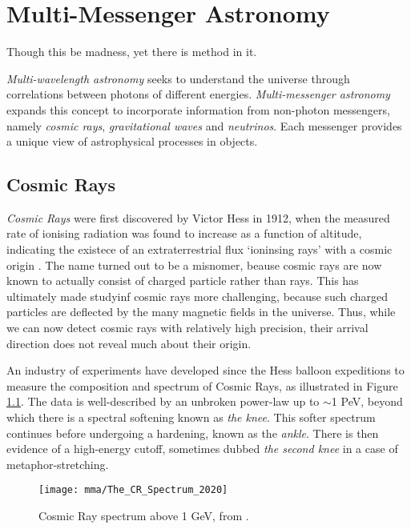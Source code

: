 \setchapterpreamble[u]{\margintoc}
\chapter{Multi-Messenger Astronomy}
\begin{fquote} Though this be madness, yet there is method in it.
\end{fquote}

\emph{Multi-wavelength astronomy} seeks to understand the universe through correlations between photons of different energies. \emph{Multi-messenger astronomy} expands this concept to incorporate information from non-photon messengers, namely \emph{cosmic rays}, \emph{gravitational waves} and \emph{neutrinos}. Each messenger provides a unique view of astrophysical processes in objects.

\section{Cosmic Rays}

\emph{Cosmic Rays} were first discovered by Victor Hess in 1912, when the measured rate of ionising radiation was found to increase as a function of altitude, indicating the existece of an extraterrestrial flux `ioninsing rays' with a cosmic origin . The name turned out to be a misnomer, beause cosmic rays are now known to actually consist of charged particle rather than rays. This has ultimately made studyinf cosmic rays more challenging, because such charged particles are deflected by the many magnetic fields in the universe. Thus, while we can now detect cosmic rays with relatively high precision, their arrival direction does not reveal much about their origin.

An industry of experiments have developed since the Hess balloon expeditions to measure the composition and spectrum of Cosmic Rays, as illustrated in Figure \ref{fig:CR_spectrum}. The data is well-described by an unbroken power-law up to $\sim$1 PeV, beyond which there is a spectral softening known as \emph{the knee}. This softer spectrum continues before undergoing a hardening, known as the \emph{ankle}. There is then evidence of a high-energy cutoff, sometimes dubbed \emph{the second knee} in a case of metaphor-stretching.

\begin{figure}
	\centering \texttt{[image: mma/The\_CR\_Spectrum\_2020]}
	\caption{Cosmic Ray spectrum above 1 GeV, from \cite{evoli_carmelo_2020_4396125}.}
	\label{fig:CR_spectrum}
\end{figure}

